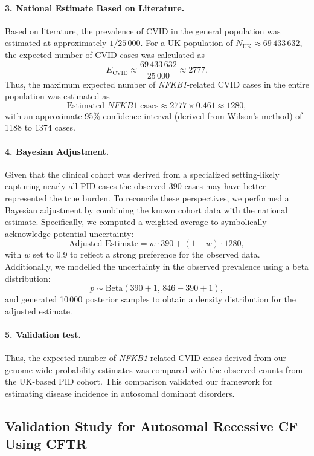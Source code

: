 \paragraph{3. National Estimate Based on Literature.}
Based on literature, the prevalence of CVID in the general population was estimated at approximately \(1/25\,000\). For a UK population of \(N_{\text{UK}} \approx 69\,433\,632\), the expected number of CVID cases was calculated as
\[
E_{\text{CVID}} \approx \frac{69\,433\,632}{25\,000} \approx 2777.
\]
Thus, the maximum expected number of \textit{NFKB1}-related CVID cases in the entire population was estimated as
\[
\text{Estimated } NFKB1 \text{ cases} \approx 2777 \times 0.461 \approx 1280,
\]
with an approximate 95\% confidence interval (derived from Wilson’s method) of 1188 to 1374 cases.

\paragraph{4. Bayesian Adjustment.}
Given that the clinical cohort was derived from a specialized setting-likely capturing nearly all PID cases-the observed 390 cases may have better represented the true burden. To reconcile these perspectives, we performed a Bayesian adjustment by combining the known cohort data with the national estimate. Specifically, we computed a weighted average to symbolically acknowledge potential uncertainty:
\[
\text{Adjusted Estimate} = w \cdot 390 + (1 - w) \cdot 1280,
\]
with \(w\) set to 0.9 to reflect a strong preference for the observed data.
Additionally, we modelled the uncertainty in the observed prevalence using a beta distribution:
\[
p \sim \mathrm{Beta}(390+1,\,846-390+1),
\]
and generated 10\,000 posterior samples to obtain a density distribution for the adjusted estimate.

\paragraph{5. Validation test.}
Thus, the expected number of \textit{NFKB1}-related CVID cases derived from our genome-wide probability estimates was compared with the observed counts from the UK-based PID cohort. This comparison validated our framework for estimating disease incidence in autosomal dominant disorders.

\subsection{Validation Study for Autosomal Recessive CF Using CFTR}

